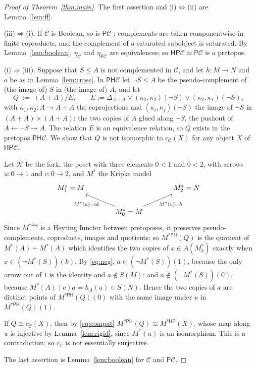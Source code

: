\documentclass[11pt]{amsart}
\theoremstyle{definition}
\newcommand{\PP}{\mathsf P}
\newcommand{\HH}{\mathsf H}
\newcommand{\cC}{\mathcal C}
\newcommand{\cK}{\mathcal K}
\begin{document}
\begin{proof}[Proof of Theorem~\ref{thm:main}]
The first assertion and (i)$\Leftrightarrow$(ii) are
Lemma~\ref{lem:ff}.

(iii)$\Rightarrow$(i). If $\cC$ is Boolean, so is $\PP\cC$
\cite[Prop.~3.4]{Morley}: complements are taken componentwise in
finite coproducts, and the complement of a saturated subobject is
saturated. By Lemma~\ref{lem:boolean}, $\eta_\cC$ and $\eta_{\PP\cC}$
are equivalences; so $\HH\PP\cC\simeq\PP\cC$ is a pretopos.

(i)$\Rightarrow$(iii). Suppose that $S\le A$ is not complemented in
$\cC$, and let $h\colon M\to N$ and $a$ be as in Lemma~\ref{lem:cross}.
In $\PP\HH\cC$ let $\neg S\le A$ be the pseudo-complement of (the image
of) $S$ in (the image of) $A$, and let
\[
Q\;:=\;(A+A)/E,\qquad E:=\Delta_{A+A}\vee(\kappa_1,\kappa_2)(\neg S)
\vee(\kappa_2,\kappa_1)(\neg S),
\]
with $\kappa_1,\kappa_2\colon A\to A+A$ the coprojections and
$(\kappa_i,\kappa_j)(\neg S)$ the image of $\neg S$ in $(A+A)\times
(A+A)$: the two copies of $A$ glued along $\neg S$, the pushout of
$A\leftarrow\neg S\to A$. The relation $E$ is an equivalence relation,
so $Q$ exists in the pretopos $\PP\HH\cC$. We show that $Q$ is not
isomorphic to $c_\cC(X)$ for any object $X$ of $\HH\PP\cC$.

Let $\cK$ be the fork, the poset with three elements $0<1$ and $0<2$,
with arrows $u\colon0\to1$ and $v\colon0\to2$, and $M^\ast$ the Kripke
model
\[
\begin{tikzcd}[column sep=large]
M^\ast_1=M&&M^\ast_2=N\\
&M^\ast_0=M\arrow[ul,"M^\ast(u)=\mathrm{id}"]\arrow[ur,"M^\ast(v)=h"']&
\end{tikzcd}
\]
Since $M^{\ast\PP\HH}$ is a Heyting functor between pretoposes, it
preserves pseudo-complements, coproducts, images and quotients; so
$M^{\ast\PP\HH}(Q)$ is the quotient of $M^\ast(A)+M^\ast(A)$ which
identifies the two copies of $x\in A(M^\ast_k)$ exactly when $x\in
(\neg M^\ast(S))(k)$. By \eqref{eq:neg}, $a\in(\neg M^\ast(S))(1)$,
because the only arrow out of $1$ is the identity and $a\notin S(M)$;
and $a\notin(\neg M^\ast(S))(0)$, because $M^\ast(A)(v)a=h_A(a)\in
S(N)$. Hence the two copies of $a$ are distinct points of
$M^{\ast\PP\HH}(Q)(0)$ with the same image under $u$ in
$M^{\ast\PP\HH}(Q)(1)$.

If $Q\cong c_\cC(X)$, then by \eqref{eq:compat} $M^{\ast\PP\HH}(Q)\cong
M^{\ast\HH\PP}(X)$, whose map along $u$ is injective by
Lemma~\ref{lem:rigid}, since $M^\ast(u)$ is an isomorphism. This is a
contradiction; so $c_\cC$ is not essentially surjective.

The last assertion is Lemma~\ref{lem:boolean} for $\cC$ and $\PP\cC$.
\end{proof}
\end{document}
